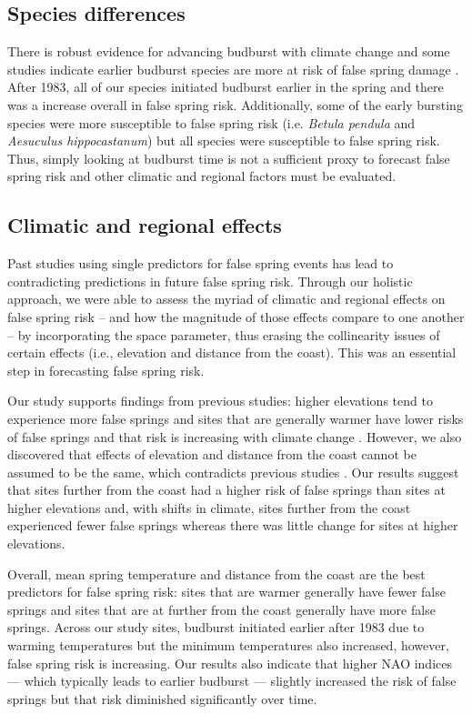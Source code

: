 \documentclass{article}\usepackage[]{graphicx}\usepackage[]{color}
\begin{document}
\subsection*{Species differences}
There is robust evidence for advancing budburst with climate change \citep{Cleland2007, Wolkovich2012, IPCC2014} and some studies indicate earlier budburst species are more at risk of false spring damage \citep{Ma2018}. After 1983, all of our species initiated budburst earlier in the spring and there was a increase overall in false spring risk. Additionally, some of the early bursting species were more susceptible to false spring risk (i.e. \textit{Betula pendula} and \textit{Aesuculus hippocastanum}) but all species were susceptible to false spring risk. Thus, simply looking at budburst time is not a sufficient proxy to forecast false spring risk and other climatic and regional factors must be evaluated.
  
\subsection*{Climatic and regional effects}
Past studies using single predictors for false spring events has lead to contradicting predictions in future false spring risk. Through our holistic approach, we were able to assess the myriad of climatic and regional effects on false spring risk -- and how the magnitude of those effects compare to one another -- by incorporating the space parameter, thus erasing the collinearity issues of certain effects (i.e., elevation and distance from the coast). This was an essential step in forecasting false spring risk. 

Our study supports findings from previous studies: higher elevations tend to experience more false springs \citep{Vitra2017} and sites that are generally warmer have lower risks of false springs \citep{Wypych2016} and that risk is increasing with climate change \citep{Liu2018}. However, we also discovered that effects of elevation and distance from the coast cannot be assumed to be the same, which contradicts previous studies \citep{Ma2018}. Our results suggest that sites further from the coast had a higher risk of false springs than sites at higher elevations and, with shifts in climate, sites further from the coast experienced fewer false springs whereas there was little change for sites at higher elevations. 
  
Overall, mean spring temperature and distance from the coast are the best predictors for false spring risk: sites that are warmer generally have fewer false springs and sites that are at further from the coast generally have more false springs. Across our study sites, budburst initiated earlier after 1983 due to warming temperatures but the minimum temperatures also increased, however, false spring risk is increasing. Our results also indicate that higher NAO indices --- which typically leads to earlier budburst --- slightly increased the risk of false springs but that risk diminished significantly over time.
\end{document}
